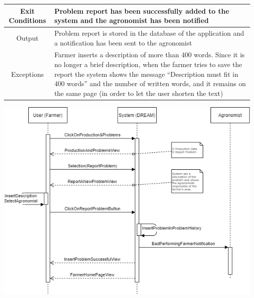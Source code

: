 \documentclass{article}
\begin{document}
\begin{center}
\begin{longtable}{|c| p{10cm}|}
        \hline
            Exit Conditions & Problem report has been successfully added to the system and the agronomist has been notified\\
        \hline
            Output & Problem report is stored in the database of the application and a notification has been sent to the agronomist\\
        \hline
            Exceptions & Farmer inserts a description of more than 400 words. Since it is no longer a brief description, when the farmer tries to save the report the system shows the message “Description must fit in 400 words” and the number of written words, and it remains on the same page (in order to let the user shorten the text) \\
        \hline
    \end{longtable}
    
    \newpage
    
    \includegraphics[width=1\textwidth]{images/sequenceDiagrams/5. FarmerReportProblem.png}
    \par
    \caption{\label{fig:frog}Farmer “Report a Problem”}

    \newpage
    
    

    

\end{center}
\end{document}

